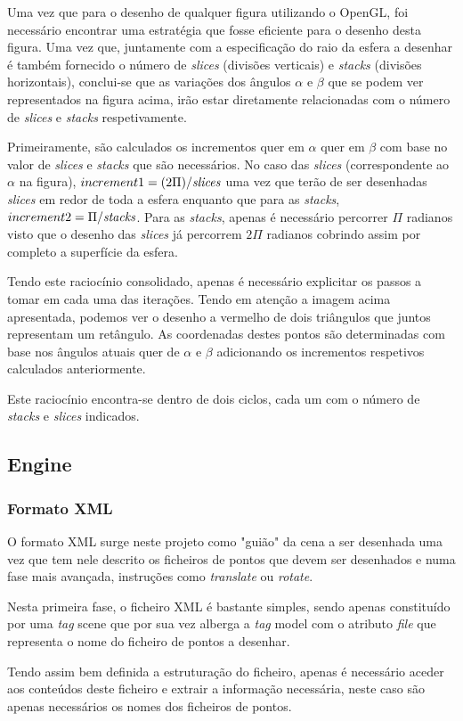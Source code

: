 \documentclass[a4paper]{article}
\begin{document}
\par Uma vez que para o desenho de qualquer figura utilizando o OpenGL, foi necessário encontrar uma estratégia que fosse eficiente para o desenho desta figura. Uma vez que, juntamente com a especificação do raio da esfera a desenhar é também fornecido o número de \emph{slices} (divisões verticais) e \emph{stacks} (divisões horizontais), conclui-se que as variações dos ângulos $\alpha$ e $\beta$ que se podem ver representados na figura acima, irão estar diretamente relacionadas com o número de \emph{slices} e \emph{stacks} respetivamente.
\par Primeiramente, são calculados os incrementos quer em $\alpha$ quer em $\beta$ com base no valor de \emph{slices} e \emph{stacks} que são necessários. No caso das \emph{slices} (correspondente ao $\alpha$ na figura), $increment1 = (2\Pi) / \emph{slices}$ uma vez que terão de ser desenhadas \emph{slices} em redor de toda a esfera enquanto que para as \emph{stacks}, $increment2 = \Pi / \emph{stacks}$. Para as \emph{stacks}, apenas é necessário percorrer $\Pi$ radianos visto que o desenho das \emph{slices} já percorrem $2\Pi$ radianos cobrindo assim por completo a superfície da esfera.
\par Tendo este raciocínio consolidado, apenas é necessário explicitar os passos a tomar em cada uma das iterações. Tendo em atenção a imagem acima apresentada, podemos ver o desenho a vermelho de dois triângulos que juntos representam um retângulo. As coordenadas destes pontos são determinadas com base nos ângulos atuais quer de $\alpha$ e $\beta$ adicionando os incrementos respetivos calculados anteriormente.
\par Este raciocínio encontra-se dentro de dois ciclos, cada um com o número de \emph{stacks} e \emph{slices} indicados.


\subsection{Engine}

\subsubsection{Formato XML}

\hspace{3mm} O formato XML surge neste projeto como "guião" da cena a ser desenhada uma vez que tem nele descrito os ficheiros de pontos que devem ser desenhados e numa fase mais avançada, instruções como \emph{translate} ou \emph{rotate}.
\par Nesta primeira fase, o ficheiro XML é bastante simples, sendo apenas constituído por uma \emph{tag} scene que por sua vez alberga a \emph{tag} model com o atributo \emph{file} que representa o nome do ficheiro de pontos a desenhar.
\par Tendo assim bem definida a estruturação do ficheiro, apenas é necessário aceder aos conteúdos deste ficheiro e extrair a informação necessária, neste caso são apenas necessários os nomes dos ficheiros de pontos.
\end{document}
